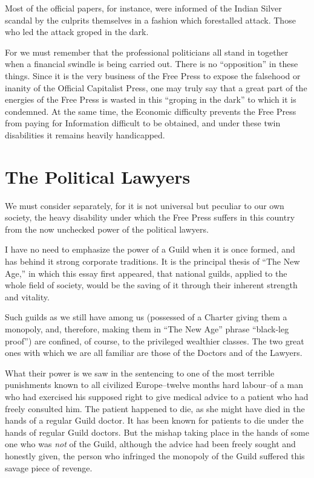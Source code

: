 \documentclass{book}
\begin{document}
Most of the official papers, for instance, were informed of the Indian Silver scandal by the culprits themselves in a fashion which forestalled attack. Those who led the attack groped in the dark.

For we must remember that the professional politicians all stand in together when a financial swindle is being carried out. There is no “opposition” in these things. Since it is the very business of the Free Press to expose the falsehood or inanity of the Official Capitalist Press, one may truly say that a great part of the energies of the Free Press is wasted in this “groping in the dark” to which it is condemned. At the same time, the Economic difficulty prevents the Free Press from paying for Information difficult to be obtained, and under these twin disabilities it remains heavily handicapped.

\section*{The Political Lawyers}
We must consider separately, for it is not universal but peculiar to our own society, the heavy disability under which the Free Press suffers in this country from the now unchecked power of the political lawyers.

I have no need to emphasize the power of a Guild when it is once formed, and has behind it strong corporate traditions. It is the principal thesis of “The New Age,” in which this essay first appeared, that national guilds, applied to the whole field of society, would be the saving of it through their inherent strength and vitality.

Such guilds as we still have among us (possessed of a Charter giving them a monopoly, and, therefore, making them in “The New Age” phrase “black-leg proof”) are confined, of course, to the privileged wealthier classes. The two great ones with which we are all familiar are those of the Doctors and of the Lawyers.

What their power is we saw in the sentencing to one of the most terrible punishments known to all civilized Europe–twelve months hard labour–of a man who had exercised his supposed right to give medical advice to a patient who had freely consulted him. The patient happened to die, as she might have died in the hands of a regular Guild doctor. It has been known for patients to die under the hands of regular Guild doctors. But the mishap taking place in the hands of some one who was \emph{not} of the Guild, although the advice had been freely sought and honestly given, the person who infringed the monopoly of the Guild suffered this savage piece of revenge.
\end{document}

